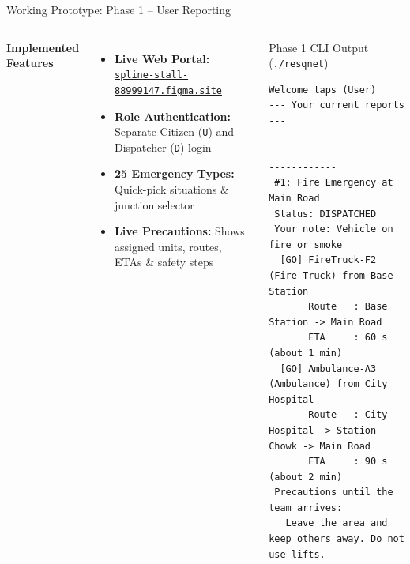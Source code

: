 \documentclass[aspectratio=169,11pt]{beamer}
\begin{document}
\begin{frame}[fragile]{Working Prototype: Phase 1 -- User Reporting}
\footnotesize
\begin{columns}[T,totalwidth=\textwidth]
\textbf{\normalsize\color{GEUBlue}Implemented Features}
\begin{itemize}\itemsep2pt
\item \textbf{Live Web Portal:} \href{https://spline-stall-88999147.figma.site}{\texttt{spline-stall-88999147.figma.site}}
\item \textbf{Role Authentication:} Separate Citizen (\texttt{U}) and Dispatcher (\texttt{D}) login
\item \textbf{25 Emergency Types:} Quick-pick situations \& junction selector
\item \textbf{Live Precautions:} Shows assigned units, routes, ETAs \& safety steps
\end{itemize}
\begin{block}{Phase 1 CLI Output (\texttt{./resqnet})}
\tiny
\begin{verbatim}
Welcome taps (User)
--- Your current reports ---
------------------------------------------------------------
 #1: Fire Emergency at Main Road
 Status: DISPATCHED
 Your note: Vehicle on fire or smoke
  [GO] FireTruck-F2 (Fire Truck) from Base Station
       Route   : Base Station -> Main Road
       ETA     : 60 s (about 1 min)
  [GO] Ambulance-A3 (Ambulance) from City Hospital
       Route   : City Hospital -> Station Chowk -> Main Road
       ETA     : 90 s (about 2 min)
 Precautions until the team arrives:
   Leave the area and keep others away. Do not use lifts.
\end{verbatim}
\end{block}
\end{columns}
\end{frame}
\end{document}
